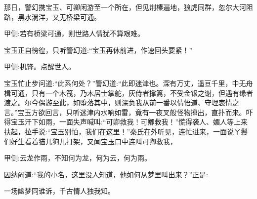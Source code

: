 \begin{parag}
    那日，警幻携宝玉、可卿闲游至一个所在，但见荆榛遍地，狼虎同群，忽尔大河阻路，黑水淌洋，又无桥梁可通。\begin{note}甲侧:若有桥梁可通，则世路人情犹不算艰难。\end{note}宝玉正自徬徨，只听警幻道:“宝玉再休前进，作速回头要紧！”\begin{note}甲侧:机锋。点醒世人。\end{note}宝玉忙止步问道:“此系何处？”警幻道:“此即迷津也。深有万丈，遥亘千里，中无舟楫可通，只有一个木筏，乃木居士掌舵，灰侍者撑篙，不受金银之谢，但遇有缘者渡之。尔今偶游至此，如堕落其中，则深负我从前一番以情悟道、守理衷情之言。”宝玉方欲回言，只听迷津内水响如雷，竟有一夜叉般怪物撺出，直扑而来。吓得宝玉汗下如雨，一面失声喊叫:“可卿救我！可卿救我！”慌得袭人、媚人等上来扶起，拉手说:“宝玉别怕，我们在这里！”秦氏在外听见，连忙进来，一面说ㄚ鬟们好生看着猫儿狗儿打架，又闻宝玉口中连叫可卿救我，\begin{note}甲侧:云龙作雨，不知何为龙，何为云，何为雨。\end{note}因纳闷道:“我的小名，这里没人知道，他如何从梦里叫出来？”正是:
\end{parag}


\begin{poem}
    \begin{pl}一场幽梦同谁诉，千古情人独我知。\end{pl}
\end{poem}

